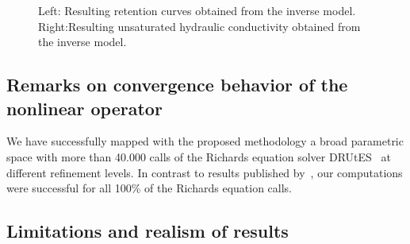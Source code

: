 \documentclass[review,times,3p,10pt]{elsarticle}
\begin{document}
\begin{figure}
\centering
{}
\caption{Left: Resulting retention curves obtained from the inverse model. Right:Resulting unsaturated hydraulic conductivity obtained from the inverse model. }
\label{retc-final}
\end{figure}

{
\subsection{Remarks on convergence behavior of the nonlinear operator}
\label{convsolver}
  We have successfully mapped with the proposed methodology a broad parametric space with more than 40.000 calls of the Richards equation solver DRUtES~\citep{drutes} at different refinement levels. In contrast to  results published by~\cite{beven2003-uncertain}, our computations were successful for all 100\% of the Richards equation calls. }  


\subsection{Limitations and realism of results}
\end{document}
